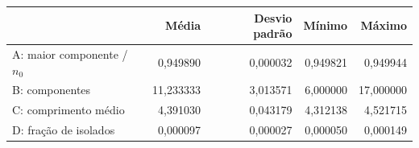 \begin{tabular}{lrrrr}
\toprule
 & Média & Desvio padrão & Mínimo & Máximo \\
\midrule
A: maior componente / $n_0$ & 0,949890 & 0,000032 & 0,949821 & 0,949944 \\
B: componentes & 11,233333 & 3,013571 & 6,000000 & 17,000000 \\
C: comprimento médio & 4,391030 & 0,043179 & 4,312138 & 4,521715 \\
D: fração de isolados & 0,000097 & 0,000027 & 0,000050 & 0,000149 \\
\bottomrule
\end{tabular}
